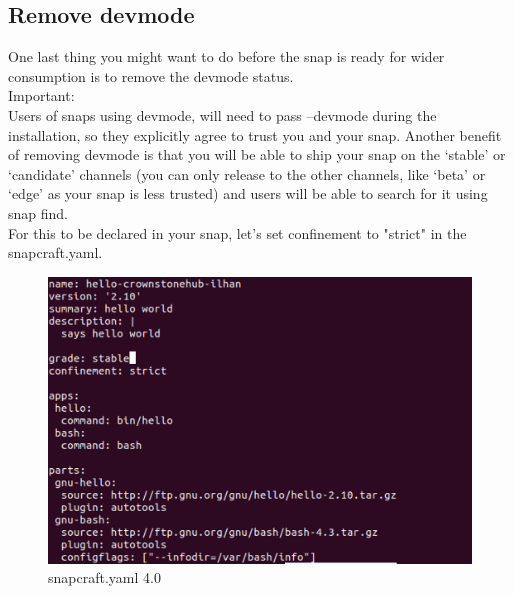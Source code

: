 \documentclass{article}
\begin{document}
\begin{flushleft}
\begin{flushleft}
%
%
%
%
%
\cleardoublepage
\section{Remove devmode}\label{sec:remove dev}
One last thing you might want to do before the snap is ready for wider consumption is to remove the
devmode status.\\
\bigskip
Important:\\
Users of snaps using devmode, will need to pass --devmode during the installation, so they
explicitly agree to trust you and your snap. Another benefit of removing devmode is that you will
be able to ship your snap on the ‘stable' or ‘candidate' channels (you can only release to the
other channels, like ‘beta' or ‘edge' as your snap is less trusted) and users will be able to
search for it using snap find.\\

\bigskip 
For this to be declared in your snap, let's set confinement to "strict" in the snapcraft.yaml. 

\label{fig:step13}	
	\begin{figure}[H]
	\includegraphics[width=5in]{step13.png}
	\caption[Optional caption]{snapcraft.yaml 4.0}
	\end{figure}
\cleardoublepage


\end{flushleft}
\end{flushleft}
\end{document}
